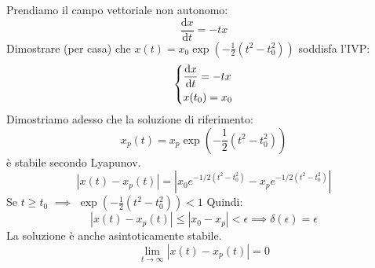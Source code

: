 \begin{exmp}[2]
    Prendiamo il campo vettoriale non autonomo:
    \[
        \frac{\text{d} x}{\text{d} t} = - tx
    \] 
    Dimostrare (per casa) che $x(t)= x_0\exp\left(-\frac{1}{2}(t^2-t_0^2)\right)$ soddisfa l'IVP:
    \[\begin{dcases}
        \frac{\text{d} x}{\text{d} t} = -tx\\
	x(t_0)= x_0
    \end{dcases}\] 
    Dimostriamo adesso che la soluzione di riferimento:
    \[
        x_p(t)= x_p\exp\left(-\frac{1}{2}(t^2-t_0^2)\right)
    \] 
    è stabile secondo Lyapunov.
    \[
	\left|x(t)-x_p(t)\right|= \left|x_0e^{-1 /2(t^2-t_0^2)} - x_pe^{-1 /2(t^2-t_0^2)}\right|
    \] 
    Se $t\ge t_0$ $\implies$ $\exp \left(- \frac{1}{2}(t^2-t_0^2)\right)<1$ Quindi:
    \[
	\left|x(t)-x_p(t)\right|\le \left|x_0-x_p\right|< \epsilon  \implies  \delta (\epsilon)=\epsilon
    \] 
    La soluzione è anche asintoticamente stabile.
    \[
	\lim_{t \to \infty} \left|x(t)-x_p(t)\right| = 0
    \] 
\end{exmp}
\noindent
